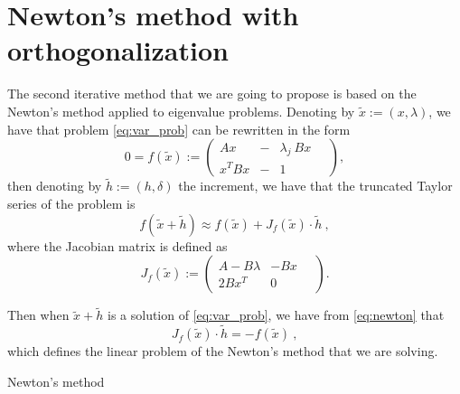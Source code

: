 \documentclass[preprint ,12pt]{elsarticle}
\begin{document}
\section{Newton's method with orthogonalization}

The second iterative method that we are going to propose is based on the Newton's method applied to eigenvalue problems. Denoting by $\tilde x:=(x,\lambda)$, we have that problem \eqref{eq:var_prob} can be rewritten in the form
$$
0=f(\tilde x):=
\left(
\begin{array}{lcl}
A x&-& \lambda_j\ Bx
\\
  x^T Bx&-& 1
\end{array}\quad
\right) ,
$$
then denoting by $\tilde h:=(h, \delta)$ the increment, we have that the truncated Taylor series of the problem is
\begin{equation}\label{eq:newton}
f(\tilde x + \tilde h)\approx f(\tilde x) + J_f(\tilde x)\cdot \tilde h\ , 
\end{equation}
where the Jacobian matrix is defined as
$$
J_f(\tilde x):=
\left(
\begin{array}{lr}
A - B\lambda & -Bx
\\
  2Bx^T  & 0
\end{array}\quad
\right) .
$$

Then when $\tilde x + \tilde h$ is a solution of \eqref{eq:var_prob}, we have from \eqref{eq:newton}
that 
$$
J_f(\tilde x)\cdot \tilde h = - f(\tilde x)\ ,
$$
which defines the linear problem of the Newton's method that we are solving.
\begin{algorithm}[H] \caption{Newton's method} \label{alg:newton} 
\begin{algorithmic}


\REPEAT

\end{algorithmic}
\end{algorithm}
\end{document}
